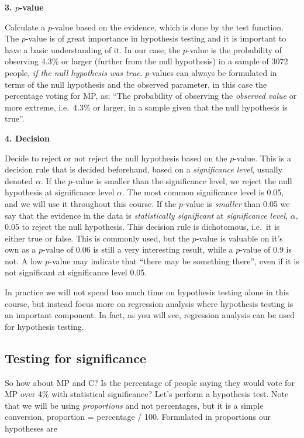 \documentclass[
  letterpaper,
  DIV=11,
  numbers=noendperiod]{scrreprt}
\begin{document}
\textbf{3. \(p\)-value}

Calculate a \(p\)-value based on the evidence, which is done by the test
function. The \(p\)-value is of great importance in hypothesis testing
and it is important to have a basic understanding of it. In our case,
the \(p\)-value is the probability of observing 4.3\% or larger (further
from the null hypothesis) in a sample of 3072 people, \emph{if the null
hypothesis was true}. \(p\)-values can always be formulated in terms of
the null hypothesis and the observed parameter, in this case the
percentage voting for MP, as: ``The probability of observing the
\emph{observed value} or more extreme, i.e.~4.3\% or larger, in a sample
given that the null hypothesis is true''.

\textbf{4. Decision}

Decide to reject or not reject the null hypothesis based on the
\(p\)-value. This is a decision rule that is decided beforehand, based
on a \emph{significance level}, usually denoted \(\alpha\). If the
\(p\)-value is smaller than the significance level, we reject the null
hypothesis at significance level \(\alpha\). The most common
significance level is 0.05, and we will use it throughout this course.
If the \(p\)-value is \emph{smaller} than 0.05 we say that the evidence
in the data is \emph{statistically significant} at \emph{significance
level}, \(\alpha\), 0.05 to reject the null hypothesis. This decision
rule is dichotomous, i.e.~it is either true or false. This is commonly
used, but the \(p\)-value is valuable on it's own as a \(p\)-value of
0.06 is still a very interesting result, while a \(p\)-value of 0.9 is
not. A low \(p\)-value may indicate that ``there may be something
there'', even if it is not significant at significance level 0.05.

In practice we will not spend too much time on hypothesis testing alone
in this course, but instead focus more on regression analysis where
hypothesis testing is an important component. In fact, as you will see,
regression analysis can be used for hypothesis testing.

\subsection{Testing for significance}\label{testing-for-significance}

So how about MP and C? Is the percentage of people saying they would
vote for MP over 4\% with statistical significance? Let's perform a
hypothesis test. Note that we will be using \emph{proportions} and not
percentages, but it is a simple conversion, proportion = percentage /
100. Formulated in proportions our hypotheses are
\end{document}
